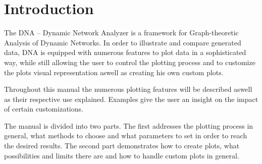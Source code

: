\chapter{Introduction}
The DNA – Dynamic Network Analyzer is a framework for Graph-theoretic Analysis of Dynamic Networks. In order to illustrate and compare generated data, DNA is equipped with numerous features to plot data in a sophisticated way, while still allowing the user to control the plotting process and to customize the plots visual representation aswell as creating his own custom plots.

Throughout this manual the numerous plotting features will be described aswell as their respective use explained. Examples give the user an insight on the impact of certain customizations.

The manual is divided into two parts. The first addresses the plotting process in general, what methods to choose and what parameters to set in order to reach the desired results. The second part demonstrates how to create plots, what possibilities and limits there are and how to handle custom plots in general.